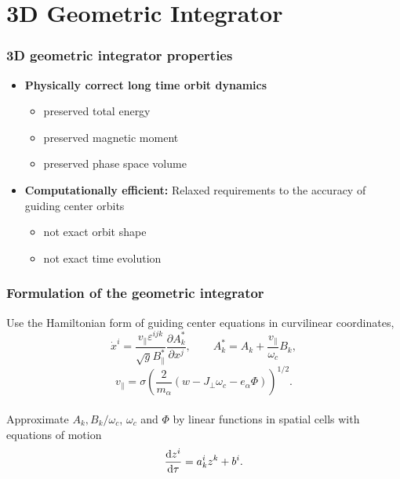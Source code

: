 \documentclass{beamer}
\newcommand{\be}[1]{\begin{equation} \label{#1}}
\newcommand{\ee}{\end{equation}}
\newcommand{\difp}[2]{\frac{\partial #1}{\partial #2}}
\newcommand{\rd}{{\rm d}}
\begin{document}
\section{3D Geometric Integrator}

\begin{frame}
\frametitle{3D geometric integrator properties}
\begin{itemize}
	\item \textbf{Physically correct long time orbit dynamics}
	\begin{itemize}
		\item preserved total energy
		\item preserved magnetic moment
		\item preserved phase space volume 
	\end{itemize}
	\item \textbf{Computationally efficient:} Relaxed requirements to the accuracy of guiding center orbits
		\begin{itemize}
			\item not exact orbit shape
			\item not exact time evolution
		\end{itemize}
\end{itemize}
\end{frame}

\begin{frame}
\frametitle{Formulation of the geometric integrator}
\vspace{-0.5cm}
Use the Hamiltonian form of guiding center equations in curvilinear coordinates,
\be{eqm_curv}
\dot x^i = \frac{v_\parallel \varepsilon^{ijk}}{\sqrt{g} B_\parallel^\ast}\difp{A^\ast_k}{x^j}, \qquad A^\ast_k = A_k + \frac{v_\parallel}{\omega_c}B_k,
\ee
\be{}
v_\parallel=\sigma \left(\frac{2}{m_\alpha}\left(w-J_\perp\omega_c-e_\alpha\Phi\right)\right)^{1/2}.
\ee
\vspace{0.2cm}\\
Approximate $A_k, B_k/ \omega_c$, $\omega_c$ and $\Phi$ by linear functions in spatial cells with equations of motion
\be{standeqset}
\frac{\rd z^i}{\rd \tau} = a^i_k z^k + b^i.
\ee
\end{frame}
\end{document}
